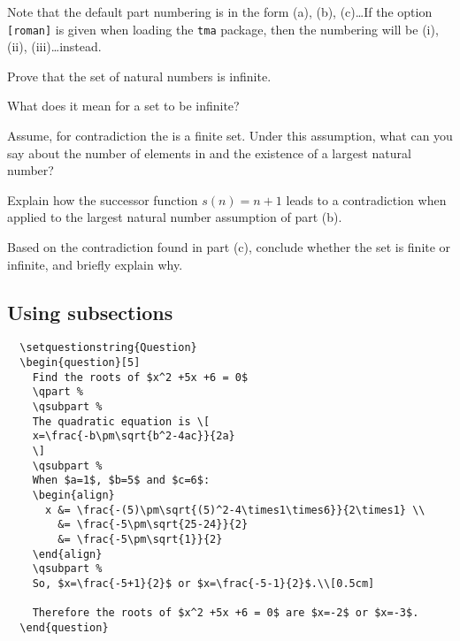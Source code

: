\documentclass[a4paper,11pt,twoside]{article}
\begin{document}
Note that the default part numbering is in the form (a), (b), (c)\dots If the option \verb|[roman]| is given when loading the \verb|tma| package, then the numbering will be (i), (ii), (iii)\dots instead.

\begin{center}
\begin{minipage}{0.7\textwidth}
\begin{question}[4]
  Prove that the set \N{} of natural numbers is infinite.

  \qpart
    What does it mean for a set to be infinite?

  \qpart
    Assume, for contradiction the \N{} is a finite set.
    Under this assumption, what can you say about the
    number of elements in \N{} and the existence of a
    largest natural number?

  \qpart
    Explain how the successor function $s(n) = n + 1$
    leads to a contradiction when applied to the largest
    natural number assumption of part (b).

  \qpart
    Based on the contradiction found in part (c), conclude
    whether the set \N{} is finite or infinite, and briefly
    explain why.
\end{question}
\end{minipage}
\end{center}

\subsection{Using subsections}

\begin{verbatim}
  \setquestionstring{Question}
  \begin{question}[5]
    Find the roots of $x^2 +5x +6 = 0$
    \qpart %
    \qsubpart %
    The quadratic equation is \[
    x=\frac{-b\pm\sqrt{b^2-4ac}}{2a}
    \]
    \qsubpart %
    When $a=1$, $b=5$ and $c=6$:
    \begin{align}
      x &= \frac{-(5)\pm\sqrt{(5)^2-4\times1\times6}}{2\times1} \\
        &= \frac{-5\pm\sqrt{25-24}}{2}
        &= \frac{-5\pm\sqrt{1}}{2}
    \end{align}
    \qsubpart %
    So, $x=\frac{-5+1}{2}$ or $x=\frac{-5-1}{2}$.\\[0.5cm]

    Therefore the roots of $x^2 +5x +6 = 0$ are $x=-2$ or $x=-3$.
  \end{question}
\end{verbatim}
\end{document}
